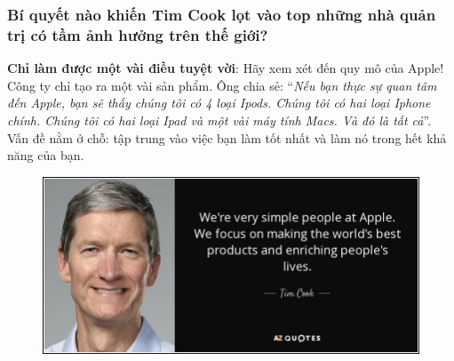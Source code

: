 \documentclass[10pt]{beamer}
\begin{document}
\begin{frame}
\transsplitverticalout
\frametitle{Bí quyết nào khiến Tim Cook lọt vào top những nhà quản trị có tầm ảnh hưởng trên thế giới?}
\pause
\textbf{Chỉ làm được một vài điều tuyệt vời}: Hãy xem xét đến quy mô của Apple! Công ty chỉ tạo ra một vài sản phẩm. Ông chia sẻ: “\emph{Nếu bạn thực sự quan tâm đến Apple, bạn sẽ thấy chúng tôi có 4 loại Ipods. Chúng tôi có hai loại Iphone chính. Chúng tôi có hai loại Ipad và một vài máy tính Macs.  Và đó là tất cả}”. Vấn đề nằm ở chỗ: tập trung vào việc bạn làm tốt nhất và làm nó trong hết khả năng của bạn.
\begin{figure}
\centering
\includegraphics[scale=0.25]{Figs/fig8}
\end{figure}

\end{frame}
\end{document}

